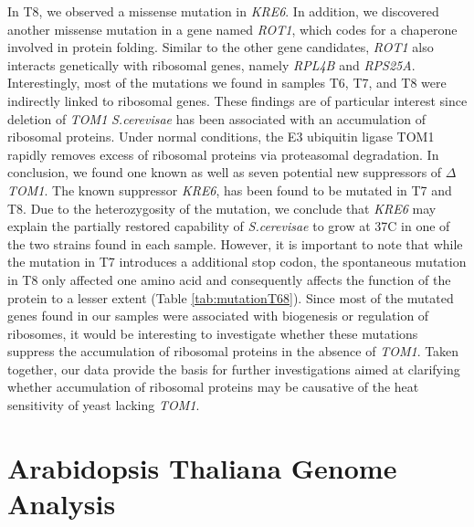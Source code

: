 \documentclass[10pt,a4paper]{article}
\begin{document}
\noindent In T8, we observed a missense mutation in \textit{KRE6}. In addition, we discovered another missense mutation in a gene named \textit{ROT1}, which codes for a chaperone involved in protein folding\cite{takeuchi_saccharomyces_2008}. Similar to the other gene candidates, \textit{ROT1} also interacts genetically with ribosomal genes, namely \textit{RPL4B} and \textit{RPS25A}.\\
 
\noindent Interestingly, most of the mutations we found in samples T6, T7, and T8 were indirectly linked to ribosomal genes. These findings are of particular interest since deletion of \textit{TOM1} \textit{S.cerevisae} has been associated with an accumulation of ribosomal proteins. Under normal conditions, the E3 ubiquitin ligase TOM1 rapidly removes excess of ribosomal proteins via proteasomal degradation\cite{sung_conserved_2016}. In conclusion, we found one known as well as seven potential new suppressors of \textit{$\Delta$TOM1}. The known suppressor \textit{KRE6}, has been found to be mutated in T7 and T8. Due to the heterozygosity of the mutation, we conclude that \textit{KRE6} may explain the partially restored capability of \textit{S.cerevisae} to grow at 37\degree C in one of the two strains found in each sample. However, it is important to note that while the mutation in T7 introduces a additional stop codon, the spontaneous mutation in T8 only affected one amino acid and consequently affects the function of the protein to a lesser extent (Table \ref{tab:mutationT68})\cite{sasaki_extragenic_2000}. Since most of the mutated genes found in our samples were associated with biogenesis or regulation of ribosomes, it would be interesting to investigate whether these mutations suppress the accumulation of ribosomal proteins in the absence of \textit{TOM1}. Taken together, our data provide the basis for further investigations aimed at clarifying whether accumulation of ribosomal proteins may be causative of the heat sensitivity of yeast lacking \textit{TOM1}.
 
 
 
 
 
 









\newpage
\part*{\Large Arabidopsis Thaliana Genome Analysis}
\end{document}
